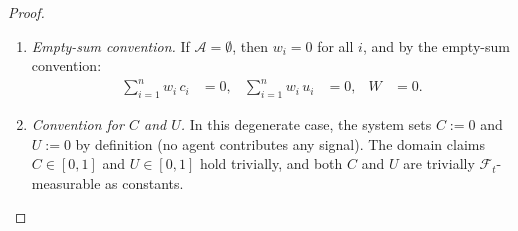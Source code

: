 \documentclass[12pt,openany]{book}
\newcommand{\calF}{\mathcal{F}}
\numberwithin{equation}{chapter}
\theoremstyle{plain}
\theoremstyle{definition}
\theoremstyle{remark}
\numberwithin{equation}{chapter}
\theoremstyle{plain}
\begin{document}
\begin{proof}
\begin{enumerate}
  \begin{enumerate}
    \item \emph{Empty-sum convention.}
      If $\mathcal{A} = \emptyset$, then $w_i = 0$ for all
      $i$, and by the empty-sum convention:
      \begin{align}
        \sum_{i=1}^{n} w_i\, c_i &= 0,
        &
        \sum_{i=1}^{n} w_i\, u_i &= 0,
        &
        W &= 0.
      \end{align}

    \item \emph{Convention for $C$ and $U$.}
      In this degenerate case, the system sets $C := 0$ and
      $U := 0$ by definition (no agent contributes any
      signal).  The domain claims $C \in [0,1]$ and
      $U \in [0,1]$ hold trivially, and both $C$ and $U$
      are trivially $\calF_t$-measurable as constants.
      \qedhere
  \end{enumerate}

\end{enumerate}
\end{proof}
\end{document}
